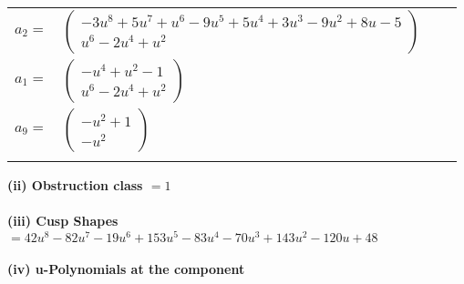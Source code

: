\documentclass[1p]{elsarticle_modified}
\theoremstyle{definition}
\begin{document}
\begin{tabular}{m{7pt} m{180pt} m{7pt} m{180pt} }
\flushright $a_{2}=$&$\begin{pmatrix}-3 u^8+5 u^7+u^6-9 u^5+5 u^4+3 u^3-9 u^2+8 u-5\\u^6-2 u^4+u^2\end{pmatrix}$ \\
\flushright $a_{1}=$&$\begin{pmatrix}- u^4+u^2-1\\u^6-2 u^4+u^2\end{pmatrix}$ \\
\flushright $a_{9}=$&$\begin{pmatrix}- u^2+1\\- u^2\end{pmatrix}$\\&\end{tabular}
\flushleft \textbf{(ii) Obstruction class $= 1$}\\~\\
\flushleft \textbf{(iii) Cusp Shapes $= 42 u^8-82 u^7-19 u^6+153 u^5-83 u^4-70 u^3+143 u^2-120 u+48$}\\~\\
\newpage\renewcommand{\arraystretch}{1}
\flushleft \textbf{(iv) u-Polynomials at the component}\newline \\
\end{document}

